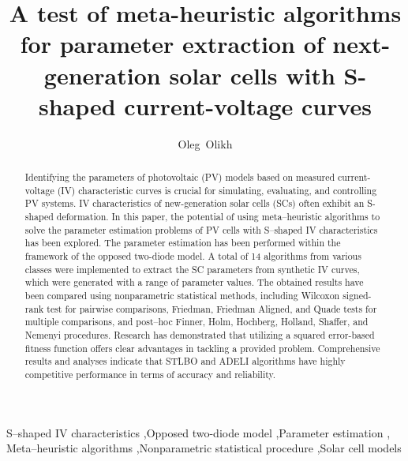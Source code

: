 \documentclass[a4paper,fleqn]{cas-sc}
\begin{document}
\let\WriteBookmarks\relax
\def\floatpagepagefraction{1}
\def\textpagefraction{.001}




\title [mode = title]{A test of meta-heuristic algorithms for parameter extraction of next-generation solar cells with S-shaped current-voltage curves}

%
\author{Oleg~Olikh}





\begin{abstract}
Identifying the parameters of photovoltaic (PV) models based on measured current-voltage (IV) characteristic curves
is crucial for simulating, evaluating, and controlling PV systems.
IV characteristics of new-generation solar cells (SCs) often exhibit an S-shaped deformation.
In this paper, the potential of using meta--heuristic algorithms
to solve the parameter estimation problems of PV cells
with S--shaped IV characteristics has been explored.
The parameter estimation has been performed within the framework of the opposed two-diode model.
A total of 14 algorithms from various classes were implemented
to extract the SC parameters from synthetic IV curves, which were generated with a range of parameter values.
The obtained results have been compared using nonparametric statistical methods,
including Wilcoxon signed-rank test for pairwise comparisons,
Friedman, Friedman Aligned, and Quade tests for multiple comparisons,
and post--hoc Finner, Holm, Hochberg, Holland,  Shaffer, and Nemenyi procedures.
Research has demonstrated that utilizing a squared error-based fitness function offers clear advantages in tackling a provided problem.
Comprehensive results and analyses indicate that STLBO and ADELI algorithms have highly competitive performance in terms of accuracy and reliability.
\end{abstract}



\begin{keywords}
S--shaped IV characteristics \sep Opposed two-diode model \sep Parameter estimation \sep
Meta--heuristic algorithms \sep Nonparametric statistical procedure \sep Solar cell models
\end{keywords}

\maketitle

\end{document}
